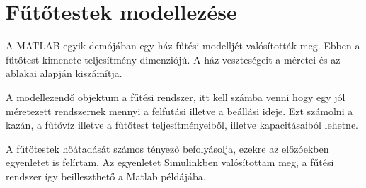\section{Fűtőtestek modellezése}

A MATLAB egyik demójában egy ház fűtési modelljét valósították meg.
Ebben a fűtőtest kimenete teljesítmény dimenziójú. 
A ház veszteségeit a méretei és az ablakai alapján kiszámítja.

A modellezendő objektum a fűtési rendszer, itt kell számba venni hogy egy jól méretezett rendszernek mennyi a felfutási illetve a beállási ideje. Ezt számolni a kazán, a fűtővíz illetve a fűtőtest teljesítményeiből, illetve kapacitásaiból lehetne.

A fűtőtestek hőátadását számos tényező befolyásolja, ezekre az előzóekben egyenletet is felírtam. Az egyenletet Simulinkben valósítottam meg, a fűtési rendszer így beilleszthető a Matlab példájába.

%





